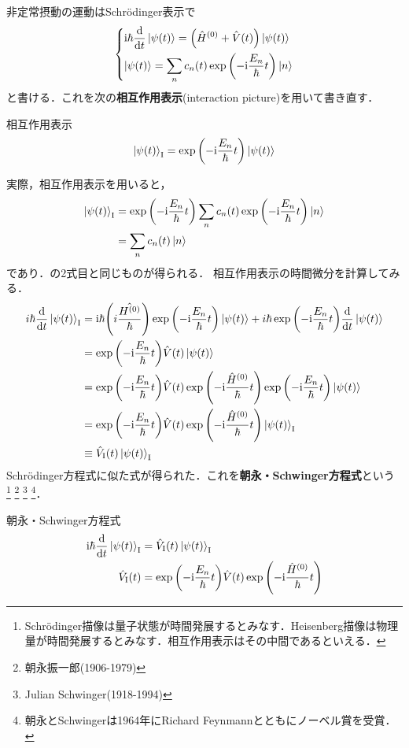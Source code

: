 \documentclass{report}
\begin{document}
  非定常摂動の運動はSchrödinger表示で
  \begin{align}
    \begin{dcases}
      \mathrm{i}\hbar\dv{t}\ket{\psi(t)} = \qty(\hat{H}^{(0)} + \hat{V}(t))\ket{\psi(t)}\label{TDSE}\\
      \ket{\psi(t)} = \sum_{n}c_n(t)\exp\qty(-\mathrm{i}\frac{E_n}{\hbar}t)\ket{n}
    \end{dcases}
  \end{align}
  と書ける．これを次の\textbf{相互作用表示}(interaction picture)を用いて書き直す．
  \begin{itembox}[l]{相互作用表示}
    \begin{align}
      \ket{\psi(t)}_{\mathrm{I}} = \exp\qty(-\mathrm{i}\frac{E_n}{\hbar}t)\ket{\psi(t)}
    \end{align}  
  \end{itembox}
  実際，相互作用表示を用いると，
  \begin{align}
    \ket{\psi(t)}_{\mathrm{I}} &= \exp\qty(-\mathrm{i}\frac{E_n}{\hbar}t)\sum_{n}c_n(t)\exp\qty(-\mathrm{i}\frac{E_n}{\hbar}t)\ket{n}\\
    &= \sum_{n}c_n(t)\ket{n}
  \end{align}
  であり．の2式目と同じものが得られる．
  相互作用表示の時間微分を計算してみる．
  \begin{align}
    i\hbar\dv{t}\ket{\psi(t)}_{\mathrm{I}} &= \mathrm{i}\hbar\qty(i\frac{\hat{H^{(0)}}}{\hbar})\exp\qty(-\mathrm{i}\frac{E_n}{\hbar}t)\ket{\psi(t)} + i\hbar\exp\qty(-\mathrm{i}\frac{E_n}{\hbar}t)\dv{t}\ket{\psi(t)}\\
    & = \exp\qty(-\mathrm{i}\frac{E_n}{\hbar}t)\hat{V}(t)\ket{\psi(t)}\\
    & = \exp\qty(-\mathrm{i}\frac{E_n}{\hbar}t)\hat{V}(t)\exp\qty(-\mathrm{i}\frac{\hat{H}^{(0)}}{\hbar}t)\exp\qty(-\mathrm{i}\frac{E_n}{\hbar}t)\ket{\psi(t)}\\
    & = \exp\qty(-\mathrm{i}\frac{E_n}{\hbar}t)\hat{V}(t)\exp\qty(-\mathrm{i}\frac{\hat{H}^{(0)}}{\hbar}t)\ket{\psi(t)}_{\mathrm{I}}\\
    &\equiv\hat{V}_{\mathrm{I}}(t)\ket{\psi(t)}_{\mathrm{I}}
  \end{align}
  Schrödinger方程式に似た式が得られた．これを\textbf{朝永・Schwinger方程式}という
  \footnote{Schrödinger描像は量子状態が時間発展するとみなす．Heisenberg描像は物理量が時間発展するとみなす．相互作用表示はその中間であるといえる．}  
  \footnote{朝永振一郎(1906-1979)}
  \footnote{Julian Schwinger(1918-1994)}
  \footnote{朝永とSchwingerは1964年にRichard Feynmannとともにノーベル賞を受賞．}．
  \begin{itembox}[l]{朝永・Schwinger方程式}
    \begin{align}
      \mathrm{i}\hbar\dv{t}\ket{\psi(t)}_{\mathrm{I}} &= \hat{V}_{\mathrm{I}}(t)\ket{\psi(t)}_{\mathrm{I}}\label{Tomonaga}\\
      \hat{V}_{\mathrm{I}}(t)& = \exp\qty(-\mathrm{i}\frac{E_n}{\hbar}t)\hat{V}(t)\exp\qty(-\mathrm{i}\frac{\hat{H}^{(0)}}{\hbar}t)
    \end{align}
  \end{itembox}
\end{document}
